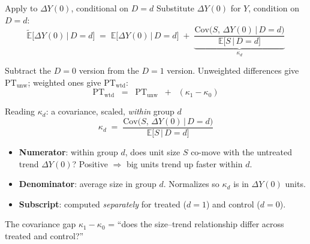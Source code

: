 \documentclass[aspectratio=169,11pt]{beamer}
\begin{document}
\begin{frame}{Apply to $\Delta Y(0)$, conditional on $D{=}d$}
\vspace{0.2em}
Substitute $\Delta Y(0)$ for $Y$, condition on $D{=}d$:
\vspace{-0.3em}
\[
\widetilde{\mathbb{E}}\!\big[\Delta Y(0) \,\big|\, D{=}d\big] \;=\; \mathbb{E}\!\big[\Delta Y(0) \,\big|\, D{=}d\big] \;+\; \underbrace{\frac{\mathrm{Cov}\!\big(S,\, \Delta Y(0) \,\big|\, D{=}d\big)}{\mathbb{E}\!\big[S \,\big|\, D{=}d\big]}}_{\displaystyle \kappa_d}
\]
\vspace{-0.1em}

Subtract the $D{=}0$ version from the $D{=}1$ version. Unweighted differences give $\text{PT}_{\text{unw}}$; weighted ones give $\text{PT}_{\text{wtd}}$:
\vspace{-0.1em}
\[
\boxed{\;\text{PT}_{\text{wtd}} \;\;=\;\; \text{PT}_{\text{unw}} \;\;+\;\; (\kappa_1 - \kappa_0)\;}
\]
\end{frame}

\begin{frame}{Reading $\kappa_d$: a covariance, scaled, \textit{within} group $d$}
\[
\kappa_d \;=\; \frac{\mathrm{Cov}\!\big(S,\, \Delta Y(0) \,\big|\, D{=}d\big)}{\mathbb{E}\!\big[S \,\big|\, D{=}d\big]}
\]
\begin{itemize}\small
  \item \textbf{Numerator}: within group $d$, does unit size $S$ co-move with the untreated trend $\Delta Y(0)$? Positive $\Rightarrow$ big units trend up faster within $d$.
  \item \textbf{Denominator}: average size in group $d$. Normalizes so $\kappa_d$ is in $\Delta Y(0)$ units.
  \item \textbf{Subscript}: computed \textit{separately} for treated ($d{=}1$) and control ($d{=}0$).
\end{itemize}
\vspace{0.3em}
\begin{block}{The covariance gap}
\centering
$\kappa_1 - \kappa_0$ \;=\; ``does the size--trend relationship differ across treated and control?''
\end{block}
\end{frame}
\end{document}
